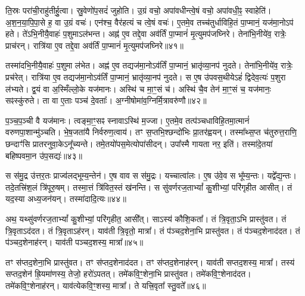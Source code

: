 ति॒स्रः परा॑ची॒राहु॑तीर्\mbox{}हु॒त्वा।
स्रु॒वेणो॑प॒सदं॑ जुहोति।
उ॒ग्रं वचो॒ अपा॑वधीन्त्वे॒षं वचो॒ अपा॑वधी॒ꣴ॒ स्वाहेति॑।
अ॒श॒न॒या॒पि॒पा॒से ह॒ वा उ॒ग्रं वचः॑।
एन॑श्च॒ वैर॑हत्यं च त्वे॒षं वचः॑।
ए॒तमे॒व तच्च॑तुर्धाविहि॒तं पा॒प्मानं॒ यज॑मा॒नोऽप॑ हते।
ते॑ऽभि॒नीयै॒वाहः॑ प॒शुमा\-ऽल॑भन्त।
अह्न॑ ए॒व तद्दे॒वा अव॑र्तिं पा॒प्मानं॑ मृ॒त्युमप॑जघ्निरे।
तेना॑भि॒नीये॑व॒ रात्रेः॒ प्राच॑रन्।
रात्रि॑या ए॒व तद्दे॒वा अव॑र्तिं पा॒प्मानं॑ मृ॒त्युमप॑जघ्निरे॥४१॥

तस्मा॑दभि॒नीयै॒वाहः॑ प॒शुमा ल॑भेत।
अह्न॑ ए॒व तद्यज॑मा॒नो\-ऽव॑र्तिं पा॒प्मानं॒ भ्रातृ॑व्या॒नप॑ नुदते।
तेना॑भि॒नीये॑व॒ रात्रेः॒ प्रच॑रेत्।
रात्रि॑या ए॒व तद्यज॑मा॒नो\-ऽव॑र्तिं पा॒प्मानं॒ भ्रातृ॑व्या॒नप॑ नुदते।
स ए॒ष उ॑पवस॒थीयेऽहं॑ द्विदेव॒त्यः॑ प॒शुरा ल॑भ्यते।
द्व॒यं वा अ॒स्मिँल्लो॒के यज॑मानः।
अस्थि॑ च मा॒ꣳ॒सं च॑।
अस्थि॑ चै॒व तेन॑ मा॒ꣳ॒सं च॒ यज॑मानः॒ सꣴस्कु॑रुते।
ता वा ए॒ताः पञ्च॑ दे॒वताः᳚।
अ॒ग्नीषोमा॑व॒ग्निर्मि॒त्रावरु॑णौ॥४२॥

प॒ञ्च॒प॒ञ्ची वै यज॑मानः।
त्वङ्मा॒ꣳ॒सꣴ स्नावा\-ऽस्थि॑ म॒ज्जा।
ए॒तमे॒व तत्प॑ञ्चधाविहि॒तमा॒त्मानं॑ वरुणपा॒शान्मु॑ञ्चति।
भे॒ष॒जता॑यै निर्वरुण॒त्वाय॑।
तꣳ स॒प्तभि॒श्छन्दो॑भिः प्रा॒तर॑ह्वयन्।
तस्मा᳚थ्स॒प्त च॑तुरुत्त॒राणि॒ छन्दाꣳ॑सि प्रातरनु\-वा॒के\-ऽनू᳚च्यन्ते।
तमे॒तयो॑पस॒मेत्योपा॑सीदन्।
उपा᳚स्मै गायता नर॒ इति॑।
तस्मा॑दे॒तया॑ बहिष्पवमा॒न उ॑प॒सद्यः॑॥४३॥\anuvakamend[ऐ॒च्छ॒न्न॒न॒य॒ꣴ॒स्ति॒ष्ठ॒न्ते॒\-ऽनूच्या॒नूच्य॑ स्रु॒वेणा॑घा॒रमा॒घार्य॒ रात्रि॑या ए॒व तद्दे॒वा अव॑र्तिं पा॒प्मानं॑ मृ॒त्युमप॑जघ्निरे मि॒त्रावरु॑णौ॒ नव॑ च (दे॒वा यज॑मानो दे॒वा दे॒वा यज॑मानो॒ यज॑मानः॒ प्राच॑रं॒ प्रच॑रे॒दाल॑भ॒न्ताल॑भेत मृ॒त्युमप॑जघ्निरे॒ भ्रातृ॑व्यान्॥)]

स स॑मु॒द्र उ॑त्तर॒तः प्राज्व॑लद्भूम्य॒न्तेन॑।
ए॒ष वाव स स॑मु॒द्रः।
यच्चात्वा॑लः।
ए॒ष उ॑वे॒व स भू᳚म्य॒न्तः।
यद्वे᳚द्य॒न्तः।
तदे॒तत्त्रि॑श॒लं त्रि॑पूरु॒षम्।
तस्मा॒त्तं त्रि॑वित॒स्तं ख॑नन्ति।
स सु॑वर्णरज॒ताभ्यां᳚ कु॒शीभ्यां॒ परि॑गृहीत आसीत्।
तं यद॒स्या अध्य॒जन॑यन्।
तस्मा॑दादि॒त्यः॥४४॥

अथ॒ यथ्सु॑वर्णरज॒ताभ्यां᳚ कु॒शीभ्यां॒ परि॑गृहीत॒ आसी᳚त्।
साऽस्य॑ कौशि॒कता᳚।
तं त्रि॒वृता॒ऽभि प्रास्तु॑वत।
तं त्रि॒वृता\-ऽद॑दत।
तं त्रि॒वृता\-ऽह॑रन्।
याव॑ती त्रि॒वृतो॒ मात्रा᳚।
तं प॑ञ्चद॒शेना॒भि प्रास्तु॑वत।
तं प॑ञ्चद॒शेनाद॑दत।
तं प॑ञ्चद॒शेनाह॑रन्।
याव॑ती पञ्चद॒शस्य॒ मात्रा᳚॥४५॥

तꣳ स॑प्तद॒शेना॒भि प्रास्तु॑वत।
तꣳ स॑प्तद॒शेनाद॑दत।
तꣳ स॑प्तद॒शेनाह॑रन्।
याव॑ती सप्तद॒शस्य॒ मात्रा᳚।
तस्य॑ सप्तद॒शेन॑ ह्रि॒यमा॑णस्य॒ तेजो॒ हरो॑\-ऽपतत्।
तमे॑कवि॒ꣳ॒शेना॒भि प्रास्तु॑वत।
तमे॑कवि॒ꣳ॒शेनाद॑दत।
तमे॑कवि॒ꣳ॒शेनाह॑रन्।
याव॑त्येकवि॒ꣳ॒शस्य॒ मात्रा᳚।
ते यत्त्रि॒वृता᳚ स्तु॒वते᳚॥४६॥

